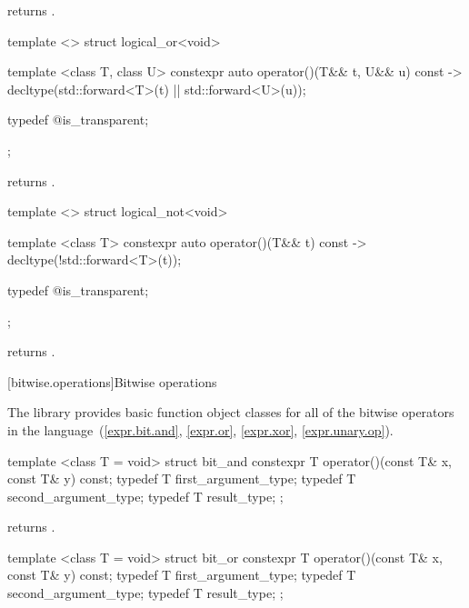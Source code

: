 \begin{itemdescr}
\pnum
{} returns .
\end{itemdescr}

%
\begin{itemdecl}
template <> struct logical_or<void> {
  template <class T, class U> constexpr auto operator()(T&& t, U&& u) const
    -> decltype(std::forward<T>(t) || std::forward<U>(u));

  typedef @\unspec@ is_transparent;
};
\end{itemdecl}

\begin{itemdescr}
\pnum
{} returns .
\end{itemdescr}

%
\begin{itemdecl}
template <> struct logical_not<void> {
  template <class T> constexpr auto operator()(T&& t) const
    -> decltype(!std::forward<T>(t));

  typedef @\unspec@ is_transparent;
};
\end{itemdecl}

\begin{itemdescr}
\pnum
{} returns .
\end{itemdescr}


[bitwise.operations]{Bitwise operations}

\pnum
The library provides basic function object classes for all of the bitwise
operators in the language~(\ref{expr.bit.and}, \ref{expr.or},
\ref{expr.xor}, \ref{expr.unary.op}).

%
\begin{itemdecl}
template <class T = void> struct bit_and {
  constexpr T operator()(const T& x, const T& y) const;
  typedef T first_argument_type;
  typedef T second_argument_type;
  typedef T result_type;
};
\end{itemdecl}

\begin{itemdescr}
\pnum
{} returns .
\end{itemdescr}

%
\begin{itemdecl}
template <class T = void> struct bit_or {
  constexpr T operator()(const T& x, const T& y) const;
  typedef T first_argument_type;
  typedef T second_argument_type;
  typedef T result_type;
};
\end{itemdecl}

